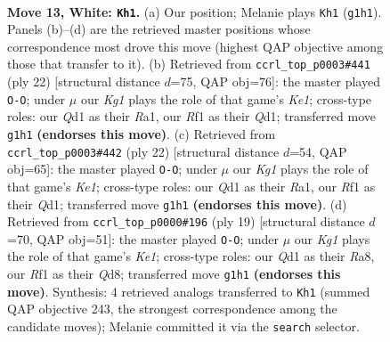 \documentclass[11pt]{article}
\begin{document}
\clearpage

\begin{figure}[p]\centering
\begin{subfigure}{0.46\textwidth}\centering
\resizebox{\linewidth}{!}{%
\newchessgame
\chessboard[
  setfen={r1bn1rk1/1pppqppp/p4n2/3P4/8/2B1PNP1/PP3PBP/R2Q1RK1 w - - 1 13},
  showmover=false,
  pgfstyle=straightmove, color=movearrow, markmove={g1-h1}
]}
\caption{}
\end{subfigure}\hfill
\begin{subfigure}{0.46\textwidth}\centering
\resizebox{\linewidth}{!}{%
\newchessgame
\chessboard[
  setfen={rnb2rk1/1p2qppp/3p1n2/p2P4/4p3/P1B3PN/1P2PPBP/R2QK2R w KQ - 0 12},
  showmover=false,
  pgfstyle=straightmove, color=movearrow, markmove={e1-g1}
]}
\caption{}
\end{subfigure}
\\[4pt]
\begin{subfigure}{0.46\textwidth}\centering
\resizebox{\linewidth}{!}{%
\newchessgame
\chessboard[
  setfen={rn3rk1/pp2qppp/3p1n2/3P1b2/4p3/P1B3PN/1P2PPBP/R2QK2R w KQ - 2 12},
  showmover=false,
  pgfstyle=straightmove, color=movearrow, markmove={e1-g1}
]}
\caption{}
\end{subfigure}\hfill
\begin{subfigure}{0.46\textwidth}\centering
\resizebox{\linewidth}{!}{%
\newchessgame
\chessboard[
  setfen={r2qk2r/pbpnbp1p/1p2pp2/8/2BPN3/5N2/PPP1QPPP/R4RK1 b kq - 5 10},
  showmover=false,
  pgfstyle=straightmove, color=movearrow, markmove={e8-g8}
]}
\caption{}
\end{subfigure}
\caption{\textbf{Move 13, White: \texttt{Kh1}.} (a) Our position; Melanie plays \texttt{Kh1} (\texttt{g1h1}). Panels (b)--(d) are the retrieved master positions whose correspondence most drove this move (highest QAP objective among those that transfer to it). (b) Retrieved from \texttt{ccrl\_top\_p0003\#441} (ply 22) [structural distance $d$=75, QAP obj=76]: the master played \texttt{O-O}; under $\mu$ our \emph{Kg1} plays the role of that game's \emph{Ke1}; cross-type roles: our \emph{Q}d1 as their \emph{R}a1, our \emph{R}f1 as their \emph{Q}d1; transferred move \texttt{g1h1} \textbf{(endorses this move)}. (c) Retrieved from \texttt{ccrl\_top\_p0003\#442} (ply 22) [structural distance $d$=54, QAP obj=65]: the master played \texttt{O-O}; under $\mu$ our \emph{Kg1} plays the role of that game's \emph{Ke1}; cross-type roles: our \emph{Q}d1 as their \emph{R}a1, our \emph{R}f1 as their \emph{Q}d1; transferred move \texttt{g1h1} \textbf{(endorses this move)}. (d) Retrieved from \texttt{ccrl\_top\_p0000\#196} (ply 19) [structural distance $d$=70, QAP obj=51]: the master played \texttt{O-O}; under $\mu$ our \emph{Kg1} plays the role of that game's \emph{Ke1}; cross-type roles: our \emph{Q}d1 as their \emph{R}a8, our \emph{R}f1 as their \emph{Q}d8; transferred move \texttt{g1h1} \textbf{(endorses this move)}. Synthesis: 4 retrieved analogs transferred to \texttt{Kh1} (summed QAP objective 243, the strongest correspondence among the candidate moves); Melanie committed it via the \texttt{search} selector.}
\label{fig:thought-m24}
\end{figure}
\end{document}
